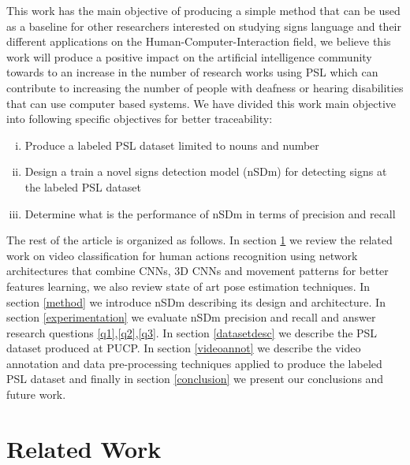 \documentclass[twocolumn,conference]{article}
\begin{document}
This work has the main objective of producing a simple method that can be used as a baseline for other researchers interested on studying signs language and their different applications on the Human-Computer-Interaction field, we believe this work will produce a positive impact on the artificial intelligence community towards to an increase in the number of research works using PSL which can contribute to increasing the number of people with deafness or hearing disabilities that can use computer based systems. We have divided this work main objective into following specific objectives for better traceability:

\begin{enumerate}[(i)]
\item Produce a labeled PSL dataset limited to nouns and number\label{o1}
\item Design a train a novel signs detection model (nSDm) for detecting signs at the labeled PSL dataset\label{o2}
\item Determine what is the performance of nSDm in terms of precision and recall\label{o3}
\end{enumerate}

The rest of the article is organized as follows. In section \ref{relatedwork} we review the related work on video classification for human actions recognition using network architectures that combine CNNs, 3D CNNs and movement patterns  for better features learning, we also review state of art pose estimation techniques. In section \ref{method} we introduce nSDm describing its design and architecture. In section \ref{experimentation} we evaluate nSDm precision and recall and answer research questions \ref{q1},\ref{q2},\ref{q3}. In section \ref{datasetdesc} we describe the PSL dataset produced at PUCP. In section \ref{videoannot} we describe the video annotation and data pre-processing techniques applied to produce the labeled PSL dataset and finally in section \ref{conclusion} we present our conclusions and future work.
\section{Related Work} \label{relatedwork}
\end{document}
